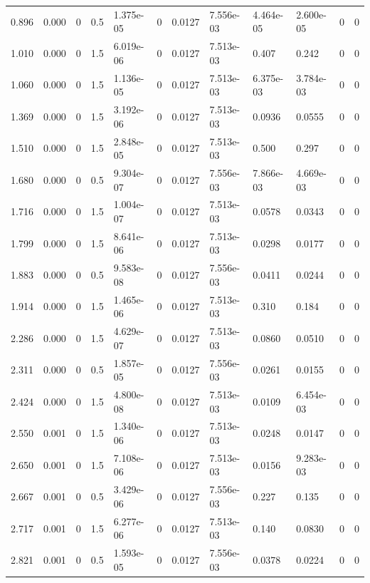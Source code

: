 \documentclass[preview]{standalone}
\begin{document}
{{\begin{tabular}{L{1.2cm}C{1.2cm} C{0.3cm}C{0.5cm} C{1.4cm}C{1.4cm} C{1.4cm}C{1.4cm} C{1.6cm}C{1.6cm} C{1.6cm}C{1.6cm}}
  0.896  &  0.000  & 0     & 0.5 &  1.375e-05  & 0  &  0.0127&   7.556e-03& 4.464e-05 & 2.600e-05   &  0 & 0  \\ 
  1.010  &  0.000  & 0     & 1.5 &  6.019e-06  & 0  &  0.0127&   7.513e-03& 0.407 & 0.242   &  0 & 0  \\ 
  1.060  &  0.000  & 0     & 1.5 &  1.136e-05  & 0  &  0.0127&   7.513e-03& 6.375e-03 & 3.784e-03   &  0 & 0  \\ 
  1.369  &  0.000  & 0     & 1.5 &  3.192e-06  & 0  &  0.0127&   7.513e-03& 0.0936 & 0.0555   &  0 & 0  \\ 
  1.510  &  0.000  & 0     & 1.5 &  2.848e-05  & 0  &  0.0127&   7.513e-03& 0.500 & 0.297   &  0 & 0  \\ 
  1.680  &  0.000  & 0     & 0.5 &  9.304e-07  & 0  &  0.0127&   7.556e-03& 7.866e-03 & 4.669e-03   &  0 & 0  \\ 
  1.716  &  0.000  & 0     & 1.5 &  1.004e-07  & 0  &  0.0127&   7.513e-03& 0.0578 & 0.0343   &  0 & 0  \\ 
  1.799  &  0.000  & 0     & 1.5 &  8.641e-06  & 0  &  0.0127&   7.513e-03& 0.0298 & 0.0177   &  0 & 0  \\ 
  1.883  &  0.000  & 0     & 0.5 &  9.583e-08  & 0  &  0.0127&   7.556e-03& 0.0411 & 0.0244   &  0 & 0  \\ 
  1.914  &  0.000  & 0     & 1.5 &  1.465e-06  & 0  &  0.0127&   7.513e-03& 0.310 & 0.184   &  0 & 0  \\ 
  2.286  &  0.000  & 0     & 1.5 &  4.629e-07  & 0  &  0.0127&   7.513e-03& 0.0860 & 0.0510   &  0 & 0  \\ 
  2.311  &  0.000  & 0     & 0.5 &  1.857e-05  & 0  &  0.0127&   7.556e-03& 0.0261 & 0.0155   &  0 & 0  \\ 
  2.424  &  0.000  & 0     & 1.5 &  4.800e-08  & 0  &  0.0127&   7.513e-03& 0.0109 & 6.454e-03   &  0 & 0  \\ 
  2.550  &  0.001  & 0     & 1.5 &  1.340e-06  & 0  &  0.0127&   7.513e-03& 0.0248 & 0.0147   &  0 & 0  \\ 
  2.650  &  0.001  & 0     & 1.5 &  7.108e-06  & 0  &  0.0127&   7.513e-03& 0.0156 & 9.283e-03   &  0 & 0  \\ 
  2.667  &  0.001  & 0     & 0.5 &  3.429e-06  & 0  &  0.0127&   7.556e-03& 0.227 & 0.135   &  0 & 0  \\ 
  2.717  &  0.001  & 0     & 1.5 &  6.277e-06  & 0  &  0.0127&   7.513e-03& 0.140 & 0.0830   &  0 & 0  \\ 
  2.821  &  0.001  & 0     & 0.5 &  1.593e-05  & 0  &  0.0127&   7.556e-03& 0.0378 & 0.0224   &  0 & 0  \\ 

\end{tabular}}}
\end{document}
